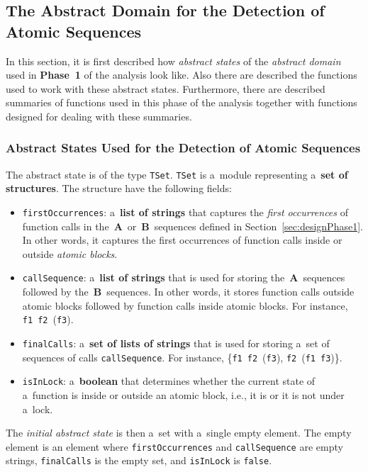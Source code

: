 \subsection{The Abstract Domain for the Detection of Atomic Sequences}
\label{sec:implementPhase1Domain}

In this section, it is first described how \emph{abstract states} of 
the \emph{abstract domain} used in \textbf{Phase~1} of the analysis
look like. Also there are described the functions used to work with 
these abstract states. Furthermore, there are described summaries 
of functions used in this phase of the analysis together with functions 
designed for dealing with these summaries.

\subsubsection{%
    Abstract States Used for the Detection of Atomic Sequences
}

The abstract state is of the type \texttt{TSet}. \texttt{TSet} is a~module
representing a~\textbf{set of structures}. The structure have the following
fields:
\begin{itemize}
    \item
        \texttt{firstOccurrences}: a~\textbf{list of strings} that captures 
        the \emph{first occurrences} of function calls in
        the~\textbf{A}~or~\textbf{B}~sequences defined in
        Section~\ref{sec:designPhase1}. In other words, it captures
        the first occurrences of function calls inside or outside
        \emph{atomic blocks}.

    \item
        \texttt{callSequence}: a~\textbf{list of strings} that is used for
        storing the~\textbf{A}~sequences followed by 
        the~\textbf{B}~sequences. In other words, it stores function calls
        outside atomic blocks followed by function calls inside atomic 
        blocks. For instance, \texttt{f1}~\texttt{f2}~(\texttt{f3}).

    \item
        \texttt{finalCalls}: a~\textbf{set of lists of strings} that is 
        used for storing a~set of sequences of calls \texttt{callSequence}. 
        For instance, \{\texttt{f1}~\texttt{f2}~(\texttt{f3}),
        \texttt{f2}~(\texttt{f1}~\texttt{f3})\}.

    \item
        \texttt{isInLock}: a~\textbf{boolean} that determines whether the
        current state of a~function is inside or outside an atomic block, 
        i.e., it is or it is not under a~lock.
\end{itemize}
The \emph{initial abstract state} is then a~set with a~single empty element.
The empty element is an element where \texttt{firstOccurrences} and
\texttt{callSequence} are empty strings, \texttt{finalCalls} is the empty 
set, and \texttt{isInLock} is \texttt{false}.

